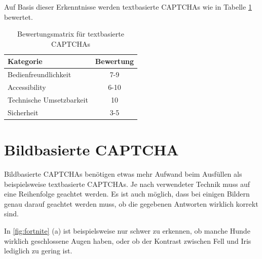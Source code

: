 Auf Basis dieser Erkenntnisse werden textbasierte CAPTCHAs wie in Tabelle \ref{table:matrix:text} bewertet.


\begin{table}[h!]
    \caption{Bewertungsmatrix für textbasierte CAPTCHAs}
    \begin{center}
        \begin{tabular}{l|c}
            Kategorie                       & Bewertung \\\hline
            Bedienfreundlichkeit            & 7-9         \\
            Accessibility                   & 6-10        \\
            Technische Umsetzbarkeit        & 10         \\
            Sicherheit                      & 3-5         
        \end{tabular}
    \end{center}
    \label{table:matrix:text}
\end{table}

\section{Bildbasierte CAPTCHA}
\label{ch:bewertung:bild}
Bildbasierte CAPTCHAs benötigen etwas mehr Aufwand beim Ausfüllen als beispielsweise textbasierte CAPTCHAs.
Je nach verwendeter Technik muss auf eine Reihenfolge geachtet werden. 
Es ist auch möglich, dass bei einigen Bildern genau darauf geachtet werden muss, ob die gegebenen Antworten wirklich korrekt sind.

In \autoref{fig:fortnite} (a) ist beispielsweise nur schwer zu erkennen, ob manche Hunde wirklich geschlossene Augen haben, 
oder ob der Kontrast zwischen Fell und Iris lediglich zu gering ist.

